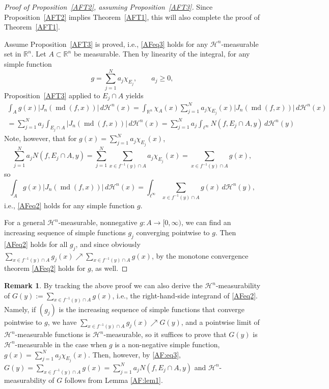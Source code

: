 \documentclass[12pt,leqno]{amsart}
\theoremstyle{definition}
\newtheorem{remark}[theorem]{Remark}
\newcommand{\bbbr}{\mathbb R}
\def\H{{\mathcal H}}
\def\md{\operatorname{md}}
\numberwithin{theorem}{section} \numberwithin{equation}{section}
\begin{document}
\begin{proof}[Proof of Proposition~\ref{AFT2}, assuming Proposition~\ref{AFT3}]
Since Proposition~\ref{AFT2} implies Theorem~\ref{AFT1}, this will also complete
the proof of Theorem~\ref{AFT1}.

Assume Proposition~\ref{AFT3} is proved, i.e., \eqref{AFeq3} holds for any $\H^n$-measurable set in $\bbbr^n$. Let $A\subset\bbbr^n$ be measurable. Then by linearity of the integral, for any simple function
$$
g=\sum_{j=1}^N a_j\chi_{E_j},\qquad a_j\geq 0,
$$
Proposition~\ref{AFT3} applied to $E_j\cap A$ yields
\[
\begin{split}
\int_A g(x) |J_n(\md(f,x))|\,d\H^n(x)=\int_{\bbbr^n} \chi_A(x)\sum_{j=1}^N a_j \chi_{E_j}(x) |J_n(\md(f,x))|\,d\H^n(x)\\
=\sum_{j=1}^N a_j \int_{E_j\cap A}|J_n(\md(f,x))|\,d\H^n(x)
=\sum_{j=1}^N a_j \int_{\ell^\infty} N(f,E_j\cap A,y)\,d\H^n(y)
\end{split}
\]
Note, however, that for $g(x)=\sum_{j=1}^N a_j\chi_{E_j}(x)$,
\begin{equation}
\label{AF:eq3}
\sum_{j=1}^N a_j N(f,E_j\cap A,y)=\sum_{j=1}^N \sum_{x\in f^{-1}(y)\cap A}a_j\chi_{E_j}(x)=\sum_{x\in f^{-1}(y)\cap A}g(x),
\end{equation}
so
$$
\int_A g(x) |J_n(\md(f,x))|\,d\H^n(x)=\int_{\ell^\infty} \sum_{x\in f^{-1}(y)\cap A}g(x)\,d\H^n(y),
$$
i.e., \eqref{AFeq2} holds for any simple function $g$.

For a general $\H^n$-measurable, nonnegative $g:A\to [0,\infty)$, we can find an increasing sequence of simple functions $g_j$ converging pointwise to $g$. Then
\eqref{AFeq2} holds for all $g_j$, and since obviously $\sum_{x\in f^{-1}(y)\cap A} g_j(x) \nearrow \sum_{x\in f^{-1}(y)\cap A}g(x) $, by the monotone convergence theorem \eqref{AFeq2} holds for $g$, as well.
\end{proof}
\begin{remark}\label{AF:rem1}
By tracking the above proof we can also derive the $\H^n$-measurability of $G(y):=\sum_{x\in f^{-1}(y)\cap A}g(x)$, i.e., the right-hand-side integrand of \eqref{AFeq2}. Namely, if $(g_j)$ is the increasing sequence of simple functions that converge pointwise to $g$, we have $\sum_{x\in f^{-1}(y)\cap A} g_j(x) \nearrow G(y)$, and a pointwise limit of $\H^n$-measurable functions is $\H^n$-measurable, so it suffices to prove that $G(y)$ is $\H^n$-measurable in the case when $g$ is a non-negative simple function, $g(x)=\sum_{j=1}^N a_j\chi_{E_j}(x)$. Then, however,  by \eqref{AF:eq3},
$G(y)=\sum_{x\in f^{-1}(y)\cap A}g(x)=\sum_{j=1}^N a_j N(f,E_j\cap A,y)$ and $\H^n$-measurability of $G$ follows from Lemma \ref{AF:lem1}.
\end{remark}
\end{document}
